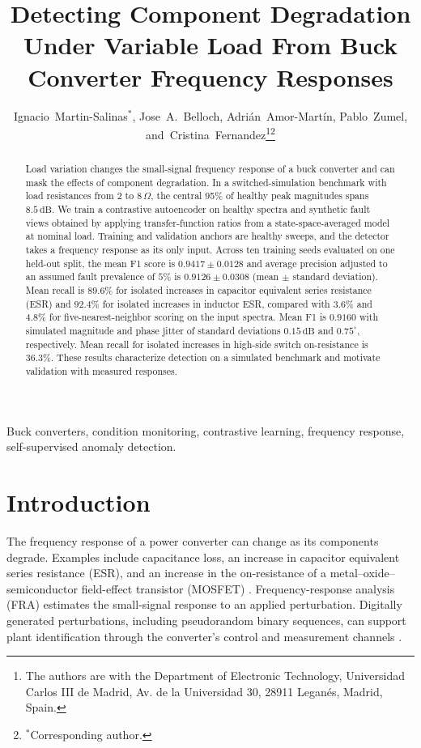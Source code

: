 \documentclass[journal]{IEEEtran}
\title{Detecting Component Degradation Under Variable Load From Buck Converter Frequency Responses}
\author{Ignacio~Martin-Salinas$^*$, Jose~A.~Belloch, Adri\'an~Amor-Mart\'in, Pablo~Zumel, and~Cristina~Fernandez\thanks{The authors are with the Department of Electronic Technology, Universidad Carlos III de Madrid, Av. de la Universidad 30, 28911 Legan\'es, Madrid, Spain.}\thanks{$^*$Corresponding author.}}
\begin{document}
\maketitle

\begin{abstract}
Load variation changes the small-signal frequency response of a buck converter and can mask the effects of component degradation. In a switched-simulation benchmark with load resistances from $2$ to $8\,\Omega$, the central 95\% of healthy peak magnitudes spans $8.5\,\mathrm{dB}$. We train a contrastive autoencoder on healthy spectra and synthetic fault views obtained by applying transfer-function ratios from a state-space-averaged model at nominal load. Training and validation anchors are healthy sweeps, and the detector takes a frequency response as its only input. Across ten training seeds evaluated on one held-out split, the mean F1 score is $0.9417\pm0.0128$ and average precision adjusted to an assumed fault prevalence of $5\%$ is $0.9126\pm0.0308$ (mean $\pm$ standard deviation). Mean recall is $89.6\%$ for isolated increases in capacitor equivalent series resistance (ESR) and $92.4\%$ for isolated increases in inductor ESR, compared with $3.6\%$ and $4.8\%$ for five-nearest-neighbor scoring on the input spectra. Mean F1 is $0.9160$ with simulated magnitude and phase jitter of standard deviations $0.15\,\mathrm{dB}$ and $0.75^\circ$, respectively. Mean recall for isolated increases in high-side switch on-resistance is $36.3\%$. These results characterize detection on a simulated benchmark and motivate validation with measured responses.
\end{abstract}

\begin{IEEEkeywords}
Buck converters, condition monitoring, contrastive learning, frequency response, self-supervised anomaly detection.
\end{IEEEkeywords}

\section{Introduction}\label{sec:1}

The frequency response of a power converter can change as its components degrade. Examples include capacitance loss, an increase in capacitor equivalent series resistance (ESR), and an increase in the on-resistance of a metal--oxide--semiconductor field-effect transistor (MOSFET) \cite{wang2014capacitors,zhao2021capacitors,celaya2010mosfet,dusmez2016sfra}. Frequency-response analysis (FRA) estimates the small-signal response to an applied perturbation. Digitally generated perturbations, including pseudorandom binary sequences, can support plant identification through the converter's control and measurement channels \cite{shirazi2009autotuning,roinila2021frequency}.
\end{document}
